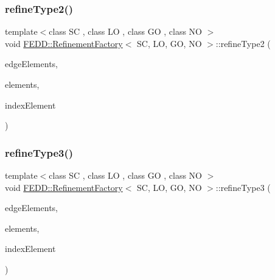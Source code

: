 \subsubsection{\texorpdfstring{refine\+Type2()}{refineType2()}}
{\footnotesize\ttfamily template$<$class SC , class LO , class GO , class NO $>$ \\
void \hyperlink{classFEDD_1_1RefinementFactory}{F\+E\+D\+D\+::\+Refinement\+Factory}$<$ SC, LO, GO, NO $>$\+::refine\+Type2 (\begin{DoxyParamCaption}\item[{\hyperlink{classFEDD_1_1RefinementFactory_ae5285e990ec4632d6188a1280627ad13}{Edge\+Elements\+Ptr\+\_\+\+Type}}]{edge\+Elements,  }\item[{\hyperlink{classFEDD_1_1RefinementFactory_a0994b5b7b6d080048673941251999f2e}{Elements\+Ptr\+\_\+\+Type}}]{elements,  }\item[{int}]{index\+Element }\end{DoxyParamCaption})}

\mbox{\label{classFEDD_1_1RefinementFactory_a282ee48e155d2f3f0e0a3faa0fa275d2}} 
\subsubsection{\texorpdfstring{refine\+Type3()}{refineType3()}}
{\footnotesize\ttfamily template$<$class SC , class LO , class GO , class NO $>$ \\
void \hyperlink{classFEDD_1_1RefinementFactory}{F\+E\+D\+D\+::\+Refinement\+Factory}$<$ SC, LO, GO, NO $>$\+::refine\+Type3 (\begin{DoxyParamCaption}\item[{\hyperlink{classFEDD_1_1RefinementFactory_ae5285e990ec4632d6188a1280627ad13}{Edge\+Elements\+Ptr\+\_\+\+Type}}]{edge\+Elements,  }\item[{\hyperlink{classFEDD_1_1RefinementFactory_a0994b5b7b6d080048673941251999f2e}{Elements\+Ptr\+\_\+\+Type}}]{elements,  }\item[{int}]{index\+Element }\end{DoxyParamCaption})}

\mbox{\label{classFEDD_1_1RefinementFactory_acb0db07f3517256e51e05380467c9782}} 
